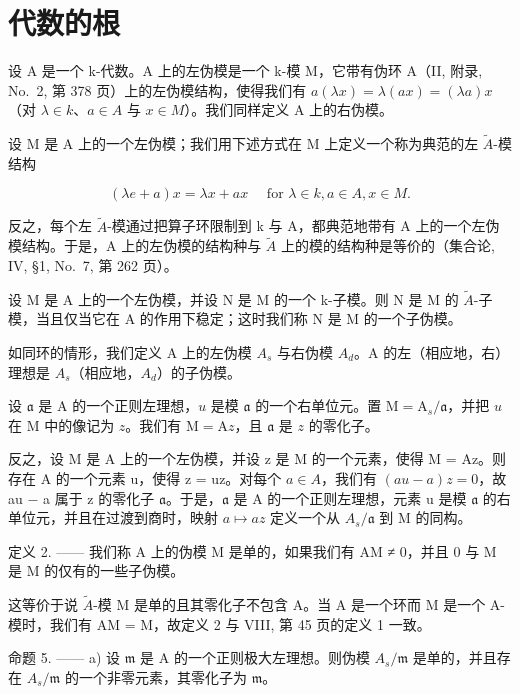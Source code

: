 \section{代数的根}

设 A 是一个 k-代数。A 上的左伪模是一个 k-模 M，它带有伪环 A（II, 附录, No.~2, 第 378 页）上的左伪模结构，使得我们有 \(a(\lambda x) = \lambda(ax) = (\lambda a)x\)（对 \(\lambda \in k\)、\(a \in A\) 与 \(x \in M\)）。我们同样定义 A 上的右伪模。

设 M 是 A 上的一个左伪模；我们用下述方式在 M 上定义一个称为典范的左 \(\tilde{A}\)-模结构

\[
(\lambda e + a) x = \lambda x + a x \quad \text { for } \lambda \in k, a \in A, x \in M.
\]

反之，每个左 \(\widetilde{A}\)-模通过把算子环限制到 k 与 A，都典范地带有 A 上的一个左伪模结构。于是，A 上的左伪模的结构种与 \(\widetilde{A}\) 上的模的结构种是等价的（集合论, IV, §1, No.~7, 第 262 页）。

设 M 是 A 上的一个左伪模，并设 N 是 M 的一个 k-子模。则 N 是 M 的 \(\widetilde{A}\)-子模，当且仅当它在 A 的作用下稳定；这时我们称 N 是 M 的一个子伪模。

如同环的情形，我们定义 A 上的左伪模 \(A_{s}\) 与右伪模 \(A_{d}\)。A 的左（相应地，右）理想是 \(A_{s}\)（相应地，\(A_{d}\)）的子伪模。

设 \(\mathfrak{a}\) 是 A 的一个正则左理想，\(u\) 是模 \(\mathfrak{a}\) 的一个右单位元。置 \(\mathrm{M} = \mathrm{A}_s / \mathfrak{a}\)，并把 \(u\) 在 M 中的像记为 \(z\)。我们有 \(\mathrm{M} = \mathrm{A}z\)，且 \(\mathfrak{a}\) 是 \(z\) 的零化子。

反之，设 M 是 A 上的一个左伪模，并设 z 是 M 的一个元素，使得 M = Az。则存在 A 的一个元素 u，使得 z = uz。对每个 \(a \in A\)，我们有 \((au - a)z = 0\)，故 au − a 属于 z 的零化子 \(\mathfrak{a}\)。于是，\(\mathfrak{a}\) 是 A 的一个正则左理想，元素 u 是模 \(\mathfrak{a}\) 的右单位元，并且在过渡到商时，映射 \(a \mapsto az\) 定义一个从 \(A_{s}/\mathfrak{a}\) 到 M 的同构。

定义 2. —— 我们称 A 上的伪模 M 是单的，如果我们有 AM ≠ 0，并且 0 与 M 是 M 的仅有的一些子伪模。

这等价于说 \(\tilde{A}\)-模 M 是单的且其零化子不包含 A。当 A 是一个环而 M 是一个 A-模时，我们有 AM = M，故定义 2 与 VIII, 第 45 页的定义 1 一致。

命题 5. —— a) 设 \(\mathfrak{m}\) 是 A 的一个正则极大左理想。则伪模 \(A_s / \mathfrak{m}\) 是单的，并且存在 \(A_s / \mathfrak{m}\) 的一个非零元素，其零化子为 \(\mathfrak{m}\)。

